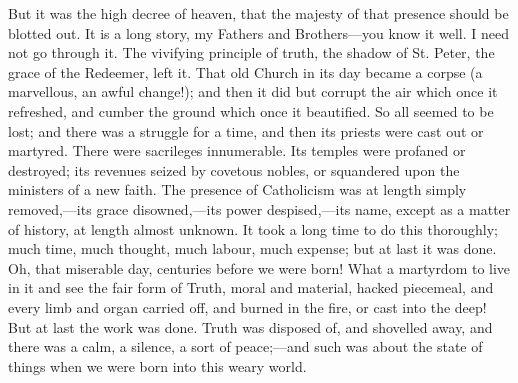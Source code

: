 But it was the high decree of heaven, that the majesty
of that presence should be blotted out. It is a long
story, my Fathers and Brothers—you know it well. I
need not go through it. The vivifying principle of truth,
the shadow of St. Peter, the grace of the Redeemer, left
it. That old Church in its day became a corpse (a
marvellous, an awful change!); and then it did but
corrupt the air which once it refreshed, and cumber the
ground which once it beautified. So all seemed to be
lost; and there was a struggle for a time, and then its
priests were cast out or martyred. There were sacrileges
innumerable. Its temples were profaned or destroyed; its
revenues seized by covetous nobles, or squandered upon
the ministers of a new faith. The presence of Catholicism
was at length simply removed,—its grace
disowned,—its power despised,—its name, except
as a matter of history, at length almost unknown. It took
a long time to do this thoroughly; much time, much
thought, much labour, much expense; but at last it was
done. Oh, that miserable day, centuries before we were
born! What a martyrdom to live in it and see the fair
form of Truth, moral and material, hacked piecemeal, and
every limb and organ carried off, and burned in the fire,
or cast into the deep! But at last the work was done.
Truth was disposed of, and shovelled away, and there was
a calm, a silence, a sort of peace;—and such was
about the state of things when we were born into this
weary world.

